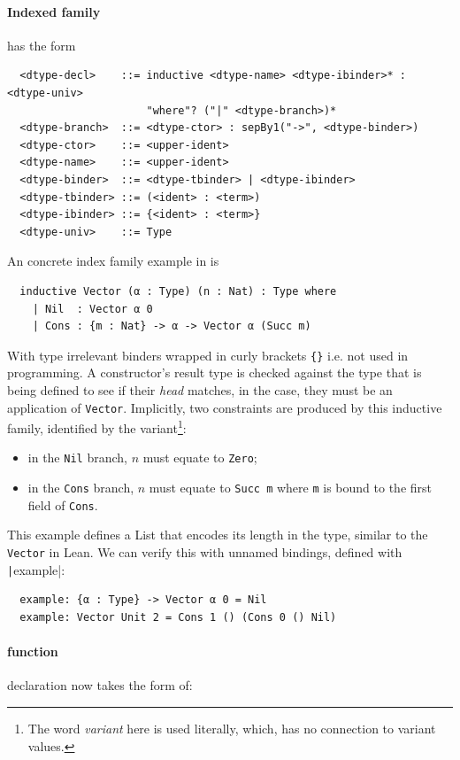 \documentclass[a4paper, 11pt]{article}
\theoremstyle{remark}\newtheorem*{remark}{Remark}
\theoremstyle{definition}\newtheorem*{definition}{Definition}
\begin{document}
\paragraph{Indexed family} has the form
\begin{verbatim}
  <dtype-decl>    ::= inductive <dtype-name> <dtype-ibinder>* : <dtype-univ>
                      "where"? ("|" <dtype-branch>)*
  <dtype-branch>  ::= <dtype-ctor> : sepBy1("->", <dtype-binder>)
  <dtype-ctor>    ::= <upper-ident>
  <dtype-name>    ::= <upper-ident>
  <dtype-binder>  ::= <dtype-tbinder> | <dtype-ibinder>
  <dtype-tbinder> ::= (<ident> : <term>)
  <dtype-ibinder> ::= {<ident> : <term>}
  <dtype-univ>    ::= Type
\end{verbatim}

An concrete index family example in \Tigrisd is

\begin{verbatim}
  inductive Vector (α : Type) (n : Nat) : Type where
    | Nil  : Vector α 0
    | Cons : {m : Nat} -> α -> Vector α (Succ m)
\end{verbatim}

With type irrelevant binders wrapped in curly brackets \texttt{\{\}} i.e. not used
in programming.
A constructor's result type is checked against the type
that is being defined to see if their \emph{head} matches,
in the case, they must be an application of \texttt{Vector}. Implicitly, two
constraints are produced by this inductive family, identified by the variant\footnote{
The word \emph{variant} here is used literally, which, has no connection to variant values.
}:
\begin{itemize}
\item in the \texttt{Nil} branch, $n$ must equate to \texttt{Zero};
\item in the \texttt{Cons} branch, $n$ must equate to \texttt{Succ m} where \texttt{m} is
bound to the first field of \texttt{Cons}.
\end{itemize}

This example defines a List that encodes its length in the type, similar to the \texttt{Vector}
in Lean. We can verify this with unnamed bindings, defined with \texttt|example|:

\begin{verbatim}
  example: {α : Type} -> Vector α 0 = Nil
  example: Vector Unit 2 = Cons 1 () (Cons 0 () Nil)
\end{verbatim}

\paragraph{function} declaration now takes the form of:
\end{document}

